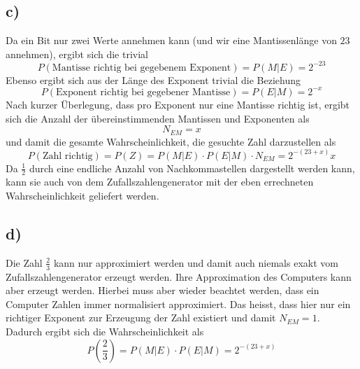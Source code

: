 \subsection{c)}
Da ein Bit nur zwei Werte annehmen kann (und wir eine Mantissenlänge von $23$ annehmen), ergibt sich die trivial
\begin{equation}
  P(\text{Mantisse richtig bei gegebenem Exponent})=P(M|E)=2^{-23}
\end{equation}
Ebenso ergibt sich aus der Länge des Exponent trivial die Beziehung
\begin{equation}
  P(\text{Exponent richtig bei gegebener Mantisse})=P(E|M)=2^{-x}
\end{equation}
Nach kurzer Überlegung, dass pro Exponent nur eine Mantisse richtig ist, ergibt sich die Anzahl der übereinstimmenden Mantissen und Exponenten als
\begin{equation}
  N_{EM}=x
\end{equation}
und damit die gesamte Wahrscheinlichkeit, die gesuchte Zahl darzustellen als
\begin{equation}
  P(\text{Zahl richtig})=P(Z)=P(M|E)\cdot P(E|M)\cdot N_{EM}=2^{-(23+x)}x
\end{equation}
Da $\frac{1}{2}$ durch eine endliche Anzahl von Nachkommastellen dargestellt werden kann, kann sie auch von dem Zufallszahlengenerator mit der eben errechneten Wahrscheinlichkeit geliefert werden.

\subsection{d)}
Die Zahl $\frac{2}{3}$ kann nur approximiert werden und damit auch niemals exakt vom Zufallszahlengenerator erzeugt werden. Ihre Approximation des Computers kann aber erzeugt werden. Hierbei muss aber wieder beachtet werden, dass ein Computer Zahlen immer normalisiert approximiert. Das heisst, dass hier nur ein richtiger Exponent zur Erzeugung der Zahl existiert und damit $N_{EM}=1$. Dadurch ergibt sich die Wahrscheinlichkeit als
\begin{equation}
  P\left(\frac{2}{3}\right)=P(M|E)\cdot P(E|M)=2^{-(23+x)}
\end{equation}

